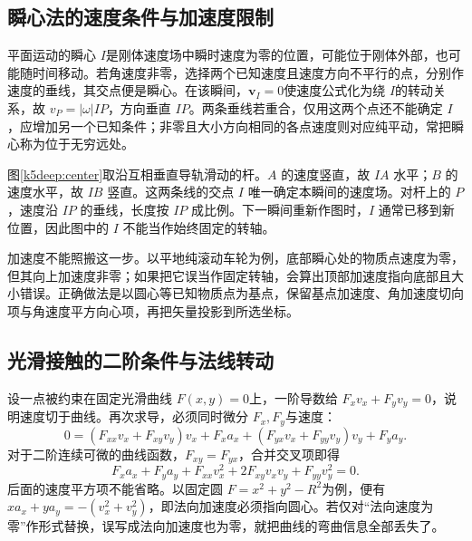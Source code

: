 \subsection{瞬心法的速度条件与加速度限制}
平面运动的瞬心 $I$是刚体速度场中瞬时速度为零的位置，可能位于刚体外部，也可能随时间移动。若角速度非零，选择两个已知速度且速度方向不平行的点，分别作速度的垂线，其交点便是瞬心。在该瞬间，$\bm v_I=0$使速度公式化为绕 $I$的转动关系，故 $v_P=|\omega|IP$，方向垂直 $IP$。两条垂线若重合，仅用这两个点还不能确定 $I$，应增加另一个已知条件；非零且大小方向相同的各点速度则对应纯平动，常把瞬心称为位于无穷远处。

图\ref{k5deep:center}取沿互相垂直导轨滑动的杆。$A$ 的速度竖直，故 $IA$ 水平；$B$ 的速度水平，故 $IB$ 竖直。这两条线的交点 $I$ 唯一确定本瞬间的速度场。对杆上的 $P$，速度沿 $IP$ 的垂线，长度按 $IP$ 成比例。下一瞬间重新作图时，$I$ 通常已移到新位置，因此图中的 $I$ 不能当作始终固定的转轴。

加速度不能照搬这一步。以平地纯滚动车轮为例，底部瞬心处的物质点速度为零，但其向上加速度非零；如果把它误当作固定转轴，会算出顶部加速度指向底部且大小错误。正确做法是以圆心等已知物质点为基点，保留基点加速度、角加速度切向项与角速度平方向心项，再把矢量投影到所选坐标。

\subsection{光滑接触的二阶条件与法线转动}
设一点被约束在固定光滑曲线 $F(x,y)=0$上，一阶导数给 $F_xv_x+F_yv_y=0$，说明速度切于曲线。再次求导，必须同时微分 $F_x,F_y$与速度：
\[0=(F_{xx}v_x+F_{xy}v_y)v_x+F_xa_x
 +(F_{yx}v_x+F_{yy}v_y)v_y+F_ya_y.\]
对于二阶连续可微的曲线函数，$F_{xy}=F_{yx}$，合并交叉项即得
\[F_xa_x+F_ya_y+F_{xx}v_x^2+2F_{xy}v_xv_y+F_{yy}v_y^2=0.
\]
后面的速度平方项不能省略。以固定圆 $F=x^2+y^2-R^2$为例，便有 $x a_x+y a_y=-(v_x^2+v_y^2)$，即法向加速度必须指向圆心。若仅对“法向速度为零”作形式替换，误写成法向加速度也为零，就把曲线的弯曲信息全部丢失了。

